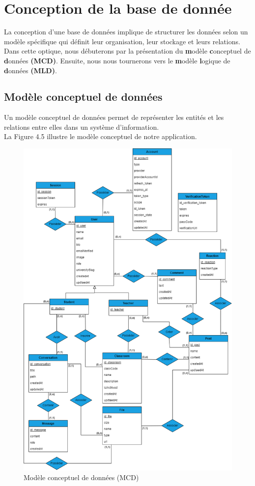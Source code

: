 \section{Conception de la base de donnée}
\justifying
La conception d'une base de données implique de structurer les données selon un modèle spécifique qui définit leur organisation, leur stockage et leurs relations. Dans cette optique, nous débuterons par la présentation du \textbf{m}odèle \textbf{c}onceptuel de \textbf{d}onnées \textbf{(MCD)}. Ensuite, nous nous tournerons vers le \textbf{m}odèle \textbf{l}ogique de \textbf{d}onnées \textbf{(MLD)}.

\subsection{Modèle conceptuel de données}
Un modèle conceptuel de données permet de représenter les entités et les relations entre elles dans un système d’information.\\
La Figure 4.5 illustre le modèle conceptuel de notre application.
\begin{figure}[H]
    \centering
    \includegraphics[width=1.1\textwidth,height=1.5\textwidth]{images/chp4/fig5.png}
    \caption{Modèle conceptuel de données (MCD)}
    \label{fig:Modèle conceptuel de données (MCD)}    
\end{figure}


